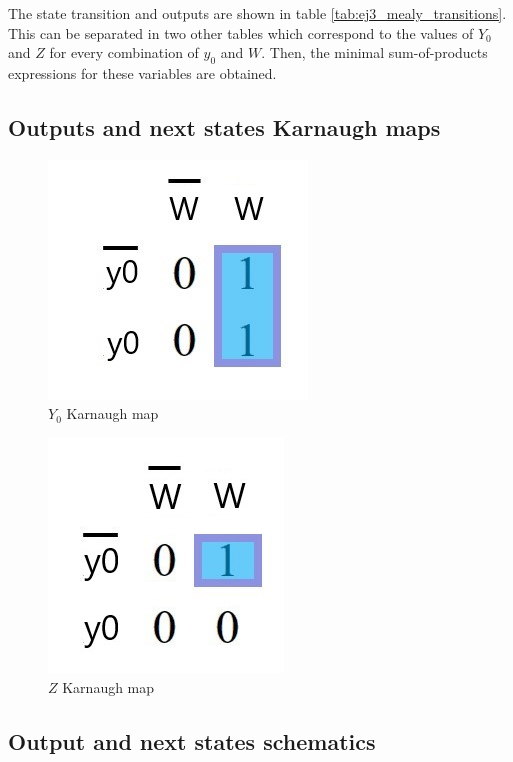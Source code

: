\documentclass[../../e3_tp3_main.tex]{subfiles}
\begin{document}
The state transition and outputs are shown in table \ref{tab:ej3_mealy_transitions}. This can be separated in two other tables which correspond to the values of $Y_0$ and $Z$ for every combination of $y_0$ and $W$. Then, the minimal sum-of-products expressions for these variables are obtained. 

\subsection{Outputs and next states Karnaugh maps}

\begin{figure}[H]
	\centering
	\includegraphics[scale=1]{figures/e3_tp3_ej3_mealy_y0_kmap.jpg}
	\caption{$Y_0$ Karnaugh map}
\end{figure}

\begin{figure}[H]
	\centering
	\includegraphics[scale=1]{figures/e3_tp3_ej3_mealy_z_kmap.jpg}
	\caption{$Z$ Karnaugh map}
\end{figure}


\subsection{Output and next states schematics}
\end{document}
